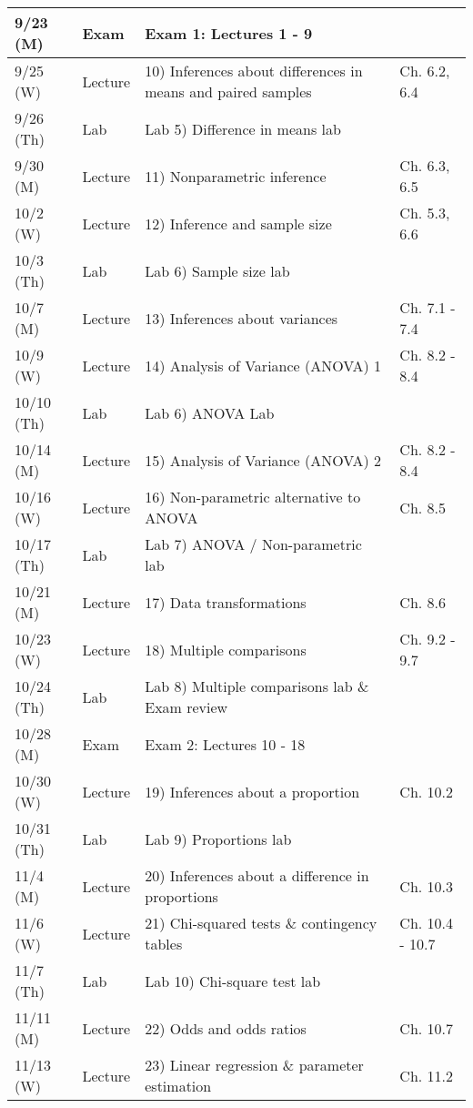 \documentclass{article}
\begin{document}
\begin{center}
\begin{tabular}{|p{2cm}|p{1.5cm}|p{9cm}|p{2.8cm}|}
		9/23 (M) & Exam & Exam 1: Lectures 1 - 9 & \\ \hline
		9/25 (W) & Lecture & 10) Inferences about differences in means and paired samples & Ch. 6.2, 6.4 \\ \hline
		9/26 (Th) & Lab & Lab 5) Difference in means lab & \\ \hline 
		9/30 (M) & Lecture &  11) Nonparametric inference & Ch. 6.3, 6.5 \\ \hline
		10/2 (W) & Lecture & 12) Inference and sample size & Ch. 5.3, 6.6 \\ \hline
		10/3 (Th) & Lab & Lab 6) Sample size lab & \\ \hline 
		10/7 (M) & Lecture & 13) Inferences about variances & Ch. 7.1 - 7.4 \\ \hline
		10/9 (W) & Lecture & 14) Analysis of Variance (ANOVA) 1 & Ch. 8.2 - 8.4 \\ \hline
		10/10 (Th) & Lab & Lab 6) ANOVA Lab & \\ \hline
		10/14 (M) & Lecture & 15) Analysis of Variance (ANOVA) 2 & Ch. 8.2 - 8.4 \\ \hline
		10/16 (W) & Lecture & 16) Non-parametric alternative to ANOVA & Ch. 8.5 \\ \hline
		10/17 (Th) & Lab & Lab 7) ANOVA / Non-parametric lab  & \\ \hline
		10/21 (M) & Lecture & 17) Data transformations & Ch. 8.6 \\ \hline
		10/23 (W) & Lecture & 18) Multiple comparisons & Ch. 9.2 - 9.7 \\ \hline
		10/24 (Th) & Lab & Lab 8) Multiple comparisons lab \& Exam review & \\ \hline
		10/28 (M) & Exam & Exam 2: Lectures 10 - 18 & \\ \hline
		10/30 (W) & Lecture & 19) Inferences about a proportion & Ch. 10.2 \\ \hline
		10/31 (Th) & Lab & Lab 9) Proportions lab & \\ \hline
		11/4 (M) & Lecture & 20) Inferences about a difference in proportions & Ch. 10.3 \\ \hline
		11/6 (W) & Lecture & 21) Chi-squared tests \& contingency tables & Ch. 10.4 - 10.7 \\ \hline
		11/7 (Th) & Lab & Lab 10) Chi-square test lab & \\ \hline
		11/11 (M) & Lecture & 22) Odds and odds ratios & Ch. 10.7 \\ \hline
		11/13 (W) & Lecture & 23) Linear regression \& parameter estimation & Ch. 11.2 \\ \hline

\end{tabular}
\end{center}
\end{document}
